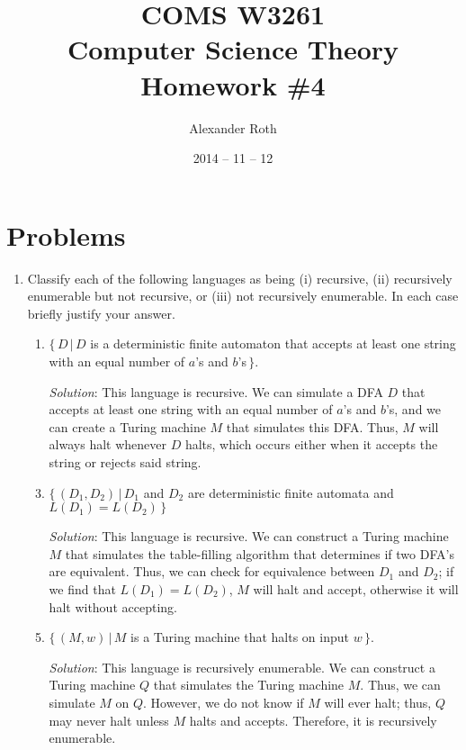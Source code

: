 \documentclass[]{article}
\begin{document}
\newtheorem{thm}{Theorem}
\title{COMS W3261 \\ Computer Science Theory \\ Homework \#4}
\author{Alexander Roth}
\date{2014 -- 11 -- 12}
\maketitle

\section*{Problems}
\begin{enumerate}
\item Classify each of the following languages as being (i) recursive, (ii)
recursively enumerable but not recursive, or (iii) not recursively enumerable.
In each case briefly justify your answer.
\begin{enumerate}
\item $\{\,D\,|\,D$ is a deterministic finite automaton that accepts at least
one string with an equal number of $a$'s and $b$'s$\,\}$.
\item[\emph{Solution}:] This language is recursive. We can simulate a DFA $D$
that accepts at least one string with an equal number of $a$'s and $b$'s, and we
can create a Turing machine $M$ that simulates this DFA. Thus, $M$ will always
halt whenever $D$ halts, which occurs either when it accepts the string or
rejects said string.

\item $\{\,(D_1,D_2)\,|\,D_1$ and $D_2$ are deterministic finite automata and
$L(D_1) = L(D_2)\,\}$
\item[\emph{Solution}:] This language is recursive. We can construct a Turing
machine $M$ that simulates the table-filling algorithm that determines if two
DFA's are equivalent. Thus, we can check for equivalence between $D_1$ and
$D_2$; if we find that $L(D_1) = L(D_2)$, $M$ will halt and accept, otherwise it
will halt without accepting.

\item $\{\,(M,w)\,|\,M$ is a Turing machine that halts on input $w\,\}$.
\item[\emph{Solution}:] This language is recursively enumerable. We can
construct a Turing machine $Q$ that simulates the Turing machine $M$. Thus, we
can simulate $M$ on $Q$. However, we do not know if $M$ will ever halt; thus,
$Q$ may never halt unless $M$ halts and accepts. Therefore, it is recursively
enumerable.


\end{enumerate}
\end{enumerate}
\end{document}
